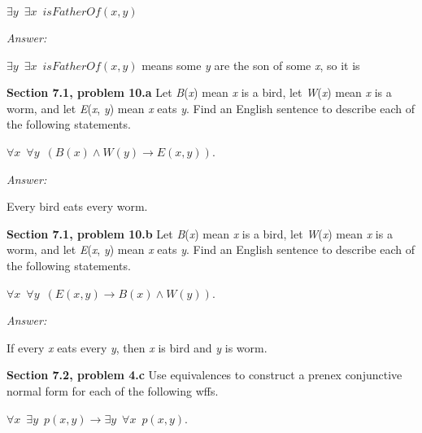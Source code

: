 \documentclass[12pt]{article}
\begin{document}
$\exists y \enspace \exists x \enspace isFatherOf(x, y)$

\emph{Answer:} 
\begin{center}
$\exists y \enspace \exists x \enspace isFatherOf(x, y)$ means some \emph{y} are the son of some \emph{x}, so it is  \\
\end{center}


\textbf{Section 7.1, problem 10.a}  Let \emph{B}(\emph{x}) mean \emph{x} is a bird, 
let \emph{W}(\emph{x}) mean \emph{x} is a worm, and let \emph{E}(\emph{x}, \emph{y}) mean \emph{x} eats \emph{y}. 
Find an English sentence to describe each of the following statements.

$\forall x \enspace \forall y \enspace (B(x) \land W(y) \rightarrow E(x, y))$.

\emph{Answer:} 
\begin{center}
 Every bird eats every worm. \\
\end{center}


\textbf{Section 7.1, problem 10.b}  Let \emph{B}(\emph{x}) mean \emph{x} is a bird, 
let \emph{W}(\emph{x}) mean \emph{x} is a worm, and let \emph{E}(\emph{x}, \emph{y}) mean \emph{x} eats \emph{y}. 
Find an English sentence to describe each of the following statements.

$\forall x \enspace \forall y \enspace (E(x, y)\rightarrow B(x) \land W(y))$.

\emph{Answer:} 
\begin{center}
If every \emph{x} eats every \emph{y}, then \emph{x} is bird and \emph{y} is worm.\\
\end{center}


\textbf{Section 7.2, problem 4.c} Use equivalences to construct 
a prenex conjunctive normal form for each of the following wffs.

$\forall x \enspace \exists y \enspace p(x,y) \rightarrow \exists y 
\enspace \forall x \enspace p(x,y)$.
\end{document}
